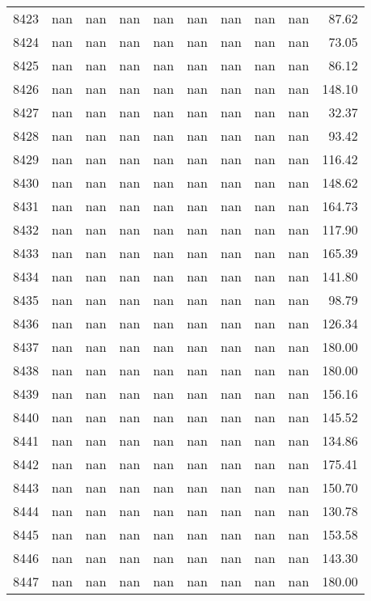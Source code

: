 \begin{tabular}{lrrrrrrrrr}
8423 & nan & nan & nan & nan & nan & nan & nan & nan & 87.62 \\
8424 & nan & nan & nan & nan & nan & nan & nan & nan & 73.05 \\
8425 & nan & nan & nan & nan & nan & nan & nan & nan & 86.12 \\
8426 & nan & nan & nan & nan & nan & nan & nan & nan & 148.10 \\
8427 & nan & nan & nan & nan & nan & nan & nan & nan & 32.37 \\
8428 & nan & nan & nan & nan & nan & nan & nan & nan & 93.42 \\
8429 & nan & nan & nan & nan & nan & nan & nan & nan & 116.42 \\
8430 & nan & nan & nan & nan & nan & nan & nan & nan & 148.62 \\
8431 & nan & nan & nan & nan & nan & nan & nan & nan & 164.73 \\
8432 & nan & nan & nan & nan & nan & nan & nan & nan & 117.90 \\
8433 & nan & nan & nan & nan & nan & nan & nan & nan & 165.39 \\
8434 & nan & nan & nan & nan & nan & nan & nan & nan & 141.80 \\
8435 & nan & nan & nan & nan & nan & nan & nan & nan & 98.79 \\
8436 & nan & nan & nan & nan & nan & nan & nan & nan & 126.34 \\
8437 & nan & nan & nan & nan & nan & nan & nan & nan & 180.00 \\
8438 & nan & nan & nan & nan & nan & nan & nan & nan & 180.00 \\
8439 & nan & nan & nan & nan & nan & nan & nan & nan & 156.16 \\
8440 & nan & nan & nan & nan & nan & nan & nan & nan & 145.52 \\
8441 & nan & nan & nan & nan & nan & nan & nan & nan & 134.86 \\
8442 & nan & nan & nan & nan & nan & nan & nan & nan & 175.41 \\
8443 & nan & nan & nan & nan & nan & nan & nan & nan & 150.70 \\
8444 & nan & nan & nan & nan & nan & nan & nan & nan & 130.78 \\
8445 & nan & nan & nan & nan & nan & nan & nan & nan & 153.58 \\
8446 & nan & nan & nan & nan & nan & nan & nan & nan & 143.30 \\
8447 & nan & nan & nan & nan & nan & nan & nan & nan & 180.00 \\

\end{tabular}
